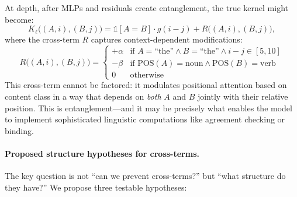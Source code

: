 \documentclass[11pt]{article}
\theoremstyle{definition}
\begin{document}
At depth, after MLPs and residuals create entanglement, the true kernel might become:
\[
K_\ell\big((A, i), (B, j)\big) = \mathbb{1}[A = B] \cdot g(i - j) + R\big((A, i), (B, j)\big),
\]
where the cross-term $R$ captures context-dependent modifications:
\[
R\big((A, i), (B, j)\big) = \begin{cases}
    +\alpha & \text{if } A = \text{``the''} \land B = \text{``the''} \land i - j \in [5, 10] \\
    -\beta & \text{if } \text{POS}(A) = \text{noun} \land \text{POS}(B) = \text{verb} \\
    0 & \text{otherwise}
\end{cases}
\]
This cross-term cannot be factored: it modulates positional attention based on content class in a way that depends on \emph{both} $A$ and $B$ jointly with their relative position. This is entanglement---and it may be precisely what enables the model to implement sophisticated linguistic computations like agreement checking or binding.

\paragraph{Proposed structure hypotheses for cross-terms.}
\label{subsec:entanglement-structure}

The key question is not ``can we prevent cross-terms?'' but ``what structure do they have?'' We propose three testable hypotheses:
\end{document}
